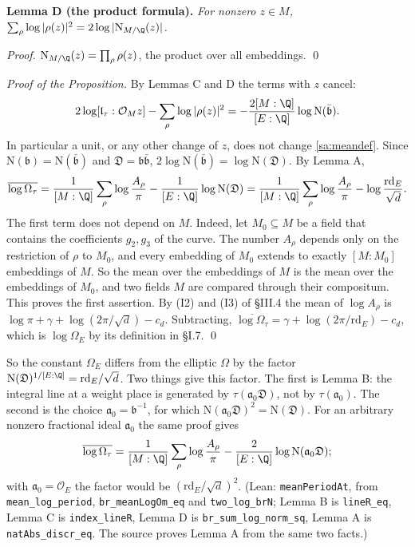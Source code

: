 \documentclass[11pt,letterpaper]{article}
\begin{document}
\textbf{Lemma D (the product formula).} \emph{For nonzero $z\in M$,\quad
$\sum_\rho\log|\rho(z)|^2=2\log|\mathrm N_{M/\Q}(z)|$.}

\emph{Proof.} $\mathrm N_{M/\Q}(z)=\prod_\rho\rho(z)$, the product over all embeddings. \qed

\noindent\emph{Proof of the Proposition.} By Lemmas C and D the terms with $z$ cancel:
\begin{equation}\label{D:288}
 2\log[\mathfrak l_\tau:\mathcal O_Mz]-\sum_\rho\log|\rho(z)|^2
 =-\frac{2[M:\Q]}{[E:\Q]}\log\mathrm N(\bar{\mathfrak b}) .
\end{equation}
In particular a unit, or any other change of $z$, does not change \eqref{sa:meandef}. Since
$\mathrm N(\mathfrak b)=\mathrm N(\bar{\mathfrak b})$ and $\mathfrak D=\mathfrak b\bar{\mathfrak b}$,
$2\log\mathrm N(\bar{\mathfrak b})=\log\mathrm N(\mathfrak D)$. By Lemma A,
\begin{equation}\label{D:289}
 \overline{\log\Omega_\tau}=\frac1{[M:\Q]}\sum_\rho\log\frac{A_\rho}\pi-\frac1{[E:\Q]}\log\mathrm N(\mathfrak D)
 =\frac1{[M:\Q]}\sum_\rho\log\frac{A_\rho}\pi-\log\frac{\mathrm{rd}_E}{\sqrt d}.
\end{equation}
The first term does not depend on $M$. Indeed, let $M_0\subseteq M$ be a field that contains the
coefficients $g_2,g_3$ of the curve. The number $A_\rho$ depends only on the restriction of $\rho$ to $M_0$,
and every embedding of $M_0$ extends to exactly $[M:M_0]$ embeddings of $M$. So the mean over the
embeddings of $M$ is the mean over the embeddings of $M_0$, and two fields $M$ are compared through their
compositum. This proves the first assertion.
By (I2) and (I3) of \S III.4 the mean of $\log A_\rho$ is $\log\pi+\gamma+\log(2\pi/\sqrt d)-c_d$. Subtracting, $\overline{\log\Omega_\tau}=\gamma+\log(2\pi/\mathrm{rd}_E)-c_d$, which is
$\log\Omega_E$ by its definition in \S I.7. \qed

\noindent So the constant $\Omega_E$ differs from the elliptic $\Omega$ by the factor
$\mathrm N(\mathfrak D)^{1/[E:\Q]}=\mathrm{rd}_E/\sqrt d$. Two things give this factor. The first is
Lemma B: the integral line at a weight place is generated by $\tau(\mathfrak a_0\mathfrak D)$, not by
$\tau(\mathfrak a_0)$. The second is the choice $\mathfrak a_0=\mathfrak b^{-1}$, for which
$\mathrm N(\mathfrak a_0\mathfrak D)^2=\mathrm N(\mathfrak D)$. For an arbitrary nonzero fractional ideal
$\mathfrak a_0$ the same proof gives
\begin{equation}\label{D:290}
 \overline{\log\Omega_\tau}=\frac1{[M:\Q]}\sum_\rho\log\frac{A_\rho}\pi
 -\frac2{[E:\Q]}\log\mathrm N(\mathfrak a_0\mathfrak D) ;
\end{equation}
with $\mathfrak a_0=\mathcal O_E$ the factor would be $(\mathrm{rd}_E/\sqrt d)^2$.
(Lean: \texttt{meanPeriodAt}, from \texttt{mean\_log\_period}, \texttt{br\_meanLogOm\_eq} and
\texttt{two\_log\_brN}; Lemma B is \texttt{lineR\_eq}, Lemma C is \texttt{index\_lineR}, Lemma D is
\texttt{br\_sum\_log\_norm\_sq}, Lemma A is \texttt{natAbs\_discr\_eq}. The source proves Lemma A from
the same two facts.)
\end{document}
